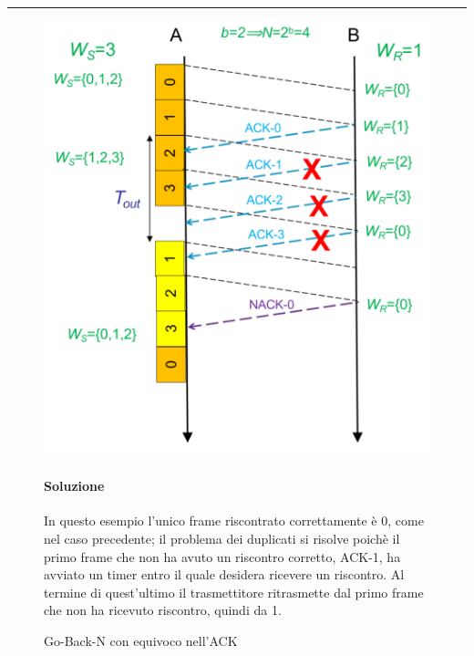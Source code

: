 \begin{figure}[htbp]
\begin{minipage}{0.45\textwidth}
    \end{minipage}
\end{figure}

\vspace{1em}
\noindent\rule{\linewidth}{0.4pt}
\vspace{1em}


\begin{figure}[htbp]
    \centering
     \begin{minipage}{0.45\textwidth}
        \includegraphics[width=\linewidth]{images/ackequivoco2.png}
        \caption{Go-Back-N con equivoco nell'ACK}

    \end{minipage}
    \hfill
    \begin{minipage}{0.5\textwidth}
        \paragraph{Soluzione} In questo esempio l'unico frame riscontrato correttamente è 0, come nel caso precedente; il problema dei duplicati si risolve poichè il primo frame che non ha avuto un riscontro corretto, ACK-1, ha avviato un timer entro il quale desidera ricevere un riscontro. 
        Al termine di quest'ultimo il trasmettitore ritrasmette dal primo frame che non ha ricevuto riscontro, quindi da 1.


\end{minipage}
\end{figure}
